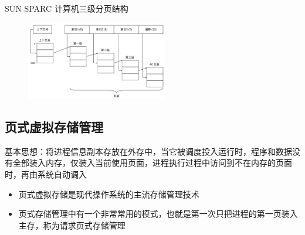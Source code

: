 \documentclass[cs4size,a4paper,10pt]{ctexart}
\begin{document}
		SUN SPARC 计算机三级分页结构
		\begin{figure}[H]
			\centering
			\includegraphics[width=0.55\textwidth]{img/3.3.3.2.3}
		\end{figure}


		\subsection{页式虚拟存储管理}
		基本思想：将进程信息副本存放在外存中，当它被调度投入运行时，程序和数据没有全部装入内存，仅装入当前使用页面，进程执行过程中访问到不在内存的页面时，再由系统自动调入
		\begin{itemize}
			\item 页式虚拟存储是现代操作系统的主流存储管理技术
			\item 页式存储管理中有一个非常常用的模式，也就是第一次只把进程的第一页装入主存，称为请求页式存储管理
		\end{itemize}
\end{document}
